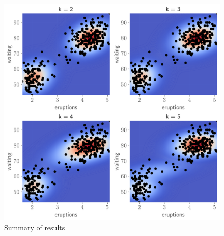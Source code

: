 \documentclass[11pt]{article}
\begin{document}
\begin{figure}[!h]
    \centering
    \includegraphics[scale=.6
    ]{../figures/bivariate.png}
    \caption{Summary of results}
    \label{fig:my_label}
\end{figure}
\end{document}
